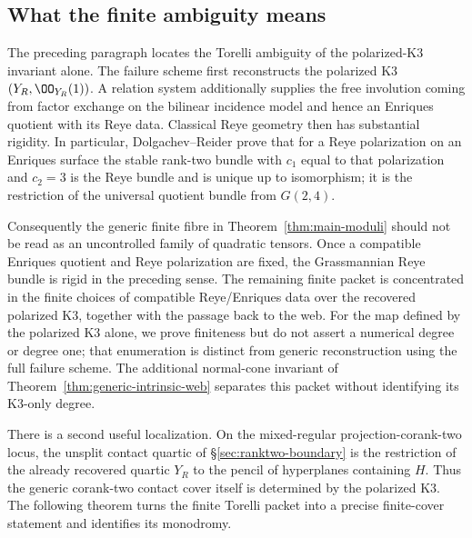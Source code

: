 \subsection{What the finite ambiguity means}

The preceding paragraph locates the Torelli ambiguity of the
polarized-K3 invariant alone.
The failure scheme first reconstructs the polarized K3
$(Y_R,\OO_{Y_R}(1))$.  A relation system additionally supplies the
free involution coming from factor exchange on the bilinear incidence
model and hence an Enriques quotient with its Reye data.  Classical
Reye geometry then has substantial rigidity.  In particular,
Dolgachev--Reider prove that for a Reye polarization on an Enriques
surface the stable rank-two bundle with
$c_1$ equal to that polarization and $c_2=3$ is the Reye bundle and
is unique up to isomorphism; it is the restriction of the universal
quotient bundle from $G(2,4)$.

Consequently the generic finite fibre in
Theorem~\ref{thm:main-moduli} should not be read as an uncontrolled
family of quadratic tensors.  Once a compatible Enriques quotient and
Reye polarization are fixed, the Grassmannian Reye bundle is rigid in
the preceding sense.  The remaining finite packet is concentrated in
the finite choices of compatible Reye/Enriques data over the recovered
polarized K3, together with the passage back to the web.  For the map defined by the polarized K3 alone, we prove finiteness
but do not assert a numerical degree or degree one; that enumeration
is distinct from generic reconstruction using the full failure
scheme.  The additional normal-cone invariant of
Theorem~\ref{thm:generic-intrinsic-web} separates this packet
without identifying its K3-only degree.

There is a second useful localization.  On the mixed-regular
projection-corank-two locus, the unsplit contact quartic of
\S\ref{sec:ranktwo-boundary} is the restriction of the already
recovered quartic $Y_R$ to the pencil of hyperplanes containing $H$.
Thus the generic corank-two contact cover itself is determined by the
polarized K3.  The following theorem turns the finite Torelli packet
into a precise finite-cover statement and identifies its monodromy.


